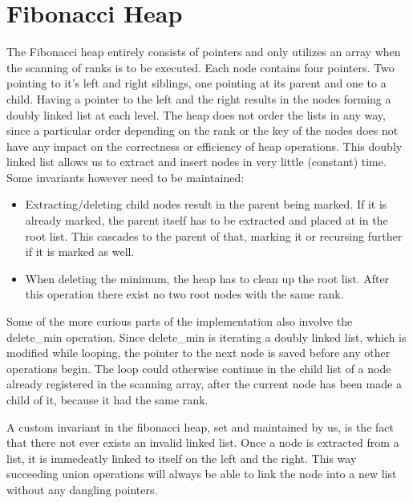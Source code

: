 \section*{Fibonacci Heap}
The Fibonacci heap entirely consists of pointers and only utilizes an array when the scanning of ranks is to be executed.
Each node contains four pointers. Two pointing to it's left and right siblings, one pointing at its parent and one to a child.
Having a pointer to the left and the right results in the nodes forming a doubly linked list at each level. The heap does not order the lists in any way, since a particular order depending on the rank or the key of the nodes does not have any impact on the correctness or efficiency of heap operations.
This doubly linked list allows us to extract and insert nodes in very little (constant) time. Some invariants however need to be maintained:
\begin{itemize}
 \item Extracting/deleting child nodes result in the parent being marked. If it is already marked, the parent itself has to be extracted and placed at in the root list. This cascades to the parent of that, marking it or recursing further if it is marked as well.
 \item When deleting the minimum, the heap has to clean up the root list. After this operation there exist no two root nodes with the same rank.
\end{itemize}
Some of the more curious parts of the implementation also involve the delete\_min operation. Since delete\_min is iterating a doubly linked list, which is modified while looping, the pointer to the next node is saved before any other operations begin. The loop could otherwise continue in the child list of a node already registered in the scanning array, after the current node has been made a child of it, because it had the same rank.

A custom invariant in the fibonacci heap, set and maintained by us, is the fact that there not ever exists an invalid linked list. Once a node is extracted from a list, it is immedeatly linked to itself on the left and the right. This way succeeding union operations will always be able to link the node into a new list without any dangling pointers.

